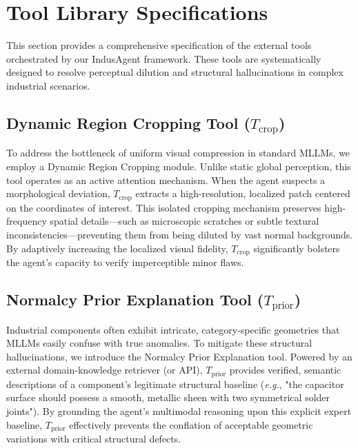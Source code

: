 \documentclass{llmxive}
\begin{document}
{\section{Tool Library Specifications}
\label{appx:tool_library}
This section provides a comprehensive specification of the external tools orchestrated by our IndusAgent framework. These tools are systematically designed to resolve perceptual dilution and structural hallucinations in complex industrial scenarios.

\subsection{Dynamic Region Cropping Tool (\texorpdfstring{$T_{\text{crop}}$}{Tcrop})}
To address the bottleneck of uniform visual compression in standard MLLMs, we employ a Dynamic Region Cropping module. Unlike static global perception, this tool operates as an active attention mechanism. When the agent suspects a morphological deviation, $T_{\text{crop}}$ extracts a high-resolution, localized patch centered on the coordinates of interest. This isolated cropping mechanism preserves high-frequency spatial details—such as microscopic scratches or subtle textural inconsistencies—preventing them from being diluted by vast normal backgrounds. By adaptively increasing the localized visual fidelity, $T_{\text{crop}}$ significantly bolsters the agent's capacity to verify imperceptible minor flaws.

\subsection{Normalcy Prior Explanation Tool (\texorpdfstring{$T_{\text{prior}}$}{Tprior})}
Industrial components often exhibit intricate, category-specific geometries that MLLMs easily confuse with true anomalies. To mitigate these structural hallucinations, we introduce the Normalcy Prior Explanation tool. Powered by an external domain-knowledge retriever (or API), $T_{\text{prior}}$ provides verified, semantic descriptions of a component's legitimate structural baseline (\textit{e.g.}, "the capacitor surface should possess a smooth, metallic sheen with two symmetrical solder joints"). By grounding the agent's multimodal reasoning upon this explicit expert baseline, $T_{\text{prior}}$ effectively prevents the conflation of acceptable geometric variations with critical structural defects.

}
\end{document}
